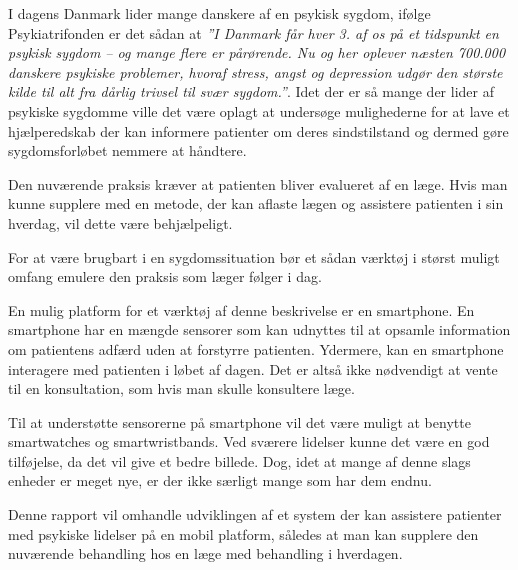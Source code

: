 


I dagens Danmark lider mange danskere af en psykisk sygdom, ifølge Psykiatrifonden er det sådan at \textit{''I Danmark får hver 3. af os på et tidspunkt en psykisk sygdom – og mange flere er pårørende. 
Nu og her oplever næsten 700.000 danskere psykiske problemer, hvoraf stress, angst og depression udgør den største kilde til alt fra dårlig trivsel til svær sygdom.''}\citep{psykiatrifonden}.
Idet der er så mange der lider af psykiske sygdomme ville det være oplagt at undersøge mulighederne for at lave et hjælperedskab der kan informere patienter om deres sindstilstand og dermed gøre sygdomsforløbet nemmere at håndtere.

Den nuværende praksis kræver at patienten bliver evalueret af en læge.
Hvis man kunne supplere med en metode, der kan aflaste lægen og assistere patienten i sin hverdag, vil dette være behjælpeligt. 

For at være brugbart i en sygdomssituation bør et sådan værktøj i størst muligt omfang emulere den praksis som læger følger i dag.

En mulig platform for et værktøj af denne beskrivelse er en smartphone.
En smartphone har en mængde sensorer som kan udnyttes til at opsamle information om patientens adfærd uden at forstyrre patienten.
Ydermere, kan en smartphone interagere med patienten i løbet af dagen. 
Det er altså ikke nødvendigt at vente til en konsultation, som hvis man skulle konsultere læge.

Til at understøtte sensorerne på smartphone vil det være muligt at benytte smartwatches og smartwristbands.
Ved sværere lidelser kunne det være en god tilføjelse, da det vil give et bedre billede.
Dog, idet at mange af denne slags enheder er meget nye, er der ikke særligt mange som har dem endnu.

Denne rapport vil omhandle udviklingen af et system der kan assistere patienter med psykiske lidelser på en mobil platform, således at man kan supplere den nuværende behandling hos en læge med behandling i hverdagen.